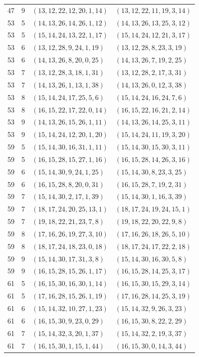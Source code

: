 \documentclass[11pt,a4paper]{article}
\theoremstyle{definition}
\numberwithin{equation}{section}
\begin{document}
\begin{longtable}{rrll}
47&9&$(13,12,22,12,20,1,14)$&$(13,12,22,11,19,3,14)$\\
53&5&$(14,13,26,14,26,1,12)$&$(14,13,26,13,25,3,12)$\\
53&5&$(15,14,24,13,22,1,17)$&$(15,14,24,12,21,3,17)$\\
53&6&$(13,12,28,9,24,1,19)$&$(13,12,28,8,23,3,19)$\\
53&6&$(14,13,26,8,20,0,25)$&$(14,13,26,7,19,2,25)$\\
53&7&$(13,12,28,3,18,1,31)$&$(13,12,28,2,17,3,31)$\\
53&7&$(14,13,26,1,13,1,38)$&$(14,13,26,0,12,3,38)$\\
53&8&$(15,14,24,17,25,5,6)$&$(15,14,24,16,24,7,6)$\\
53&8&$(16,15,22,17,22,0,14)$&$(16,15,22,16,21,2,14)$\\
53&9&$(14,13,26,15,26,1,11)$&$(14,13,26,14,25,3,11)$\\
53&9&$(15,14,24,12,20,1,20)$&$(15,14,24,11,19,3,20)$\\
59&5&$(15,14,30,16,31,1,11)$&$(15,14,30,15,30,3,11)$\\
59&5&$(16,15,28,15,27,1,16)$&$(16,15,28,14,26,3,16)$\\
59&6&$(15,14,30,9,24,1,25)$&$(15,14,30,8,23,3,25)$\\
59&6&$(16,15,28,8,20,0,31)$&$(16,15,28,7,19,2,31)$\\
59&7&$(15,14,30,2,17,1,39)$&$(15,14,30,1,16,3,39)$\\
59&7&$(18,17,24,20,25,13,1)$&$(18,17,24,19,24,15,1)$\\
59&7&$(19,18,22,21,23,7,8)$&$(19,18,22,20,22,9,8)$\\
59&8&$(17,16,26,19,27,3,10)$&$(17,16,26,18,26,5,10)$\\
59&8&$(18,17,24,18,23,0,18)$&$(18,17,24,17,22,2,18)$\\
59&9&$(15,14,30,17,31,3,8)$&$(15,14,30,16,30,5,8)$\\
59&9&$(16,15,28,15,26,1,17)$&$(16,15,28,14,25,3,17)$\\
61&5&$(16,15,30,16,30,1,14)$&$(16,15,30,15,29,3,14)$\\
61&5&$(17,16,28,15,26,1,19)$&$(17,16,28,14,25,3,19)$\\
61&6&$(15,14,32,10,27,1,23)$&$(15,14,32,9,26,3,23)$\\
61&6&$(16,15,30,9,23,0,29)$&$(16,15,30,8,22,2,29)$\\
61&7&$(15,14,32,3,20,1,37)$&$(15,14,32,2,19,3,37)$\\
61&7&$(16,15,30,1,15,1,44)$&$(16,15,30,0,14,3,44)$\\

\end{longtable}
\end{document}
